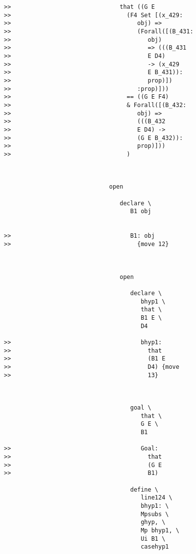 \documentclass[12pt]{article}
\begin{document}
\begin{verbatim}
>>                               that ((G E
>>                                 (F4 Set [(x_429:
>>                                    obj) =>
>>                                    (Forall([(B_431:
>>                                       obj)
>>                                       => (((B_431
>>                                       E D4)
>>                                       -> (x_429
>>                                       E B_431)):
>>                                       prop)])
>>                                    :prop)]))
>>                                 == ((G E F4)
>>                                 & Forall([(B_432:
>>                                    obj) =>
>>                                    (((B_432
>>                                    E D4) ->
>>                                    (G E B_432)):
>>                                    prop)]))
>>                                 )



                              open

                                 declare \
                                    B1 obj


>>                                  B1: obj
>>                                    {move 12}



                                 open

                                    declare \
                                       bhyp1 \
                                       that \
                                       B1 E \
                                       D4

>>                                     bhyp1:
>>                                       that
>>                                       (B1 E
>>                                       D4) {move
>>                                       13}



                                    goal \
                                       that \
                                       G E \
                                       B1

>>                                     Goal:
>>                                       that
>>                                       (G E
>>                                       B1)

                                    define \
                                       line124 \
                                       bhyp1: \
                                       Mpsubs \
                                       ghyp, \
                                       Mp bhyp1, \
                                       Ui B1 \
                                       casehyp1



\end{verbatim}
\end{document}
